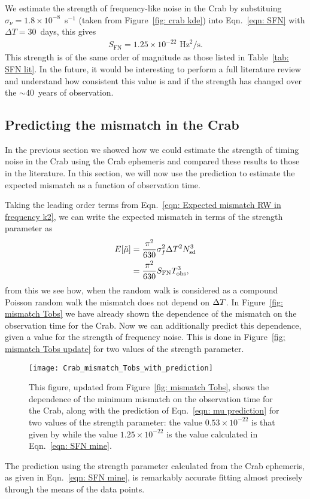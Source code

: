\documentclass[../full_thesis/full_thesis.tex]{subfiles}
\begin{document}
{We estimate the strength of frequency-like noise in the Crab by substituing
$\sigma_{\nu}=1.8\times10^{-8}$~s$^{-1}$ (taken from Figure~\ref{fig: crab
kde}) into Eqn.~\eqref{eqn: SFN} with $\Delta T = 30$~days, this gives
\begin{align}
S_{\mathrm{FN}} = 1.25 \times 10^{-22} \textrm{ Hz}^{2}/\textrm{s}.
\label{eqn: SFN mine}
\end{align}
This strength is of the same order of magnitude as those listed in
Table~\ref{tab: SFN lit}. In the future, it would be interesting to perform a
full literature review and understand how consistent this value is and if
the strength has changed over the $\sim40$~years of observation.

\subsection{Predicting the mismatch in the Crab}
In the previous section we showed how we could estimate the strength of timing
noise in the Crab using the Crab ephemeris and compared these results to those
in the literature. In this section, we will now use the prediction to estimate
the expected mismatch as a function of observation time.

Taking the leading order terms from Eqn.~\eqref{eqn: Expected mismatch RW in
frequency k2}, we can write the expected mismatch in terms of the strength
parameter as
\begin{align}
E[\tilde{\mu}] & = \frac{\pi^{2}}{630}\sigma_{f}^{2}\Delta T^{2}N_{\textrm{sd}}^{3} \\
& = \frac{\pi^{2}}{630} S_{\textrm{FN}} T_{\mathrm{obs}}^{3},
\label{eqn: mu prediction}
\end{align}
from this we see how, when the random walk is considered as a compound Poisson
random walk the mismatch does not depend on $\Delta T$. In Figure~\ref{fig: mismatch
Tobs} we have already shown the dependence of the mismatch on the observation
time for the Crab. Now we can additionally predict this dependence, given a
value for the strength of frequency noise. This is done in Figure~\ref{fig:
mismatch Tobs update} for two values of the strength parameter.
\begin{figure}[htb]
\centering
\texttt{[image: Crab\_mismatch\_Tobs\_with\_prediction]}
\caption{This figure, updated from Figure~\ref{fig: mismatch Tobs}, shows the
dependence of the minimum mismatch on the observation time for the Crab, along
with the prediction of Eqn.~\eqref{eqn: mu prediction} for two values of the
strength parameter: the value $0.53\times10^{-22}$ is that given by \citet{Groth1975}
while the value $1.25\times10^{-22}$ is the value calculated in Eqn.~\eqref{eqn: SFN mine}.}
\label{fig: mismatch Tobs update}
\end{figure}
The prediction using the strength parameter calculated from the Crab ephemeris,
as given in Eqn.~\eqref{eqn: SFN mine}, is remarkably accurate fitting almost
precisely through the means of the data points.


}
\end{document}
